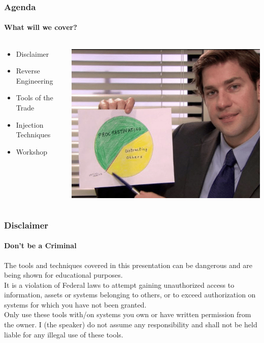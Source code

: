 \documentclass[aspectratio=169]{beamer}
\begin{document}
\begin{frame}
  \frametitle{Agenda}
  \framesubtitle{What will we cover?}
  \begin{columns}[onlytextwidth]
    \begin{column}{.50\textwidth}
      \begin{itemize}
      \item{Disclaimer}
      \item{Reverse Engineering}
      \item{Tools of the Trade}
      \item{Injection Techniques}
      \item{Workshop}
      \end{itemize}
    \end{column}
    \hfill
    \begin{column}{.50\textwidth}
      \begin{center}
        \includegraphics[scale=1.8]{agenda-meme}
      \end{center}
    \end{column}
  \end{columns}
\end{frame}

\begin{frame}
  \frametitle{Disclaimer}
  \framesubtitle{Don't be a Criminal}
  \begin{tcolorbox}[title=disclaimer\_0.log,colback=gray]
    The tools and techniques covered in this presentation can be dangerous and are\\
    being shown for educational purposes.\\
    \newline
    It is a violation of Federal laws to attempt gaining unauthorized access to information, assets or systems belonging to others, or to exceed authorization on systems for which you have not been granted.\\
    \newline
    Only use these tools with/on systems you own or have written permission from the owner. I (the speaker) do not assume any responsibility and shall not be held liable for any illegal use of these tools.\\
  \end{tcolorbox}
\end{frame}
\end{document}
